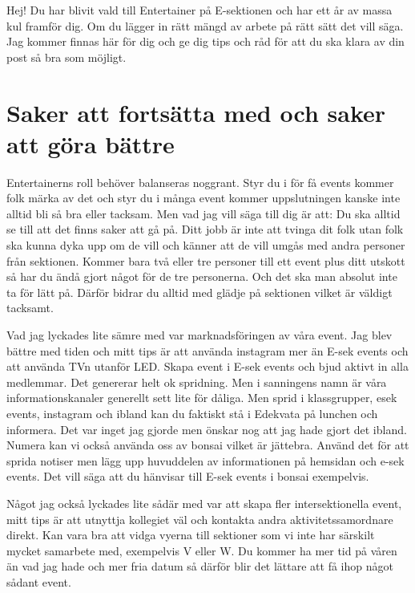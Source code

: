 \documentclass[10pt]{article}
\def\post{Entertainer}
\begin{document}
    \heading{\doctitle}

    Hej! Du har blivit vald till {\post} på E-sektionen och har ett år av massa kul framför dig. Om du lägger in rätt mängd av arbete på rätt sätt det vill säga. Jag kommer finnas här för dig och ge dig tips och råd för att du ska klara av din post så bra som möjligt.
    
    \newpage

    \tableofcontents
    \newpage

    \section{Saker att fortsätta med och saker att göra bättre}
    Entertainerns roll behöver balanseras noggrant.  Styr du i för få events kommer folk märka av det och styr du i många event kommer uppslutningen kanske inte alltid bli så bra eller tacksam. Men vad jag vill säga till dig är att: Du ska alltid se till att det finns saker att gå på. Ditt jobb är inte att tvinga dit folk utan folk ska kunna dyka upp om de vill och känner att de vill umgås med andra personer från sektionen. Kommer bara två eller tre personer till ett event plus ditt utskott så har du ändå gjort något för de tre personerna. Och det ska man absolut inte ta för lätt på. Därför bidrar du alltid med glädje på sektionen vilket är väldigt tacksamt.

    Vad jag lyckades lite sämre  med var marknadsföringen av våra event. Jag blev bättre med tiden och mitt tips är att använda instagram mer än E-sek events och att använda TVn utanför LED. Skapa event i E-sek events och bjud aktivt in alla medlemmar. Det genererar helt ok spridning. Men i sanningens namn är våra informationskanaler generellt sett lite för dåliga. Men sprid i klassgrupper, esek events, instagram och ibland kan du faktiskt stå i Edekvata på lunchen och informera. Det var inget jag gjorde men önskar nog att jag hade gjort det ibland. Numera kan vi också använda oss av bonsai vilket är jättebra. Använd det för att sprida notiser men lägg upp huvuddelen av informationen på hemsidan och e-sek events. Det vill säga att du hänvisar till E-sek events i bonsai exempelvis.

    Något jag också lyckades lite sådär med var att skapa fler intersektionella event, mitt tips är att utnyttja kollegiet väl och kontakta andra aktivitetssamordnare direkt. Kan vara bra att vidga vyerna till sektioner som vi inte har särskilt mycket samarbete med, exempelvis V eller W. Du kommer ha mer tid på våren än vad jag hade och mer fria datum så därför blir det lättare att få ihop något sådant event.
\end{document}
